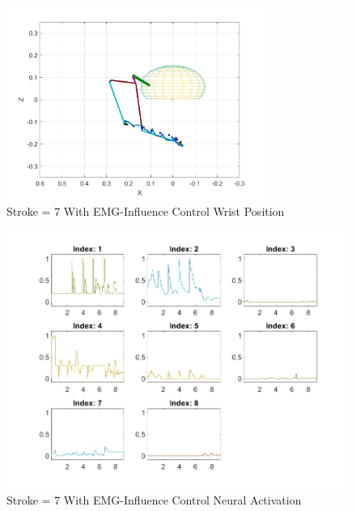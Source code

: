 \begin{figure}[h!]
\centering
\includegraphics[width=0.75\textwidth]{Pictures/Results/Controller/G(2.99)_G(14.48)_Stroke_7_position_totry(5485)_wp.jpg} 
\caption{Stroke = 7 With EMG-Influence Control Wrist Position} %
\label{fig:EMGWP} %
\end{figure}

\begin{figure}[h!]
\centering
\includegraphics[width=1\textwidth]{Pictures/Results/Controller/G(2.99)_G(14.48)_Stroke_7_position_totry(5485).png_ne.jpg} 
\caption{Stroke = 7 With EMG-Influence Control Neural Activation} %
\label{fig:EMGNA} %
\end{figure}

